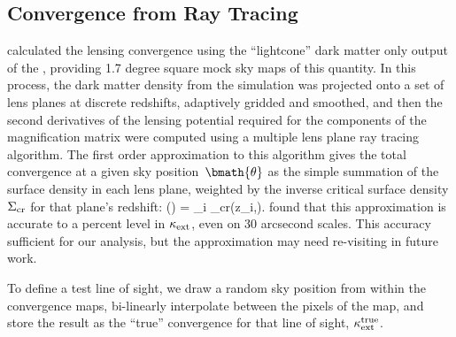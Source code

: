 \documentclass[useAMS,usenatbib,a4paper]{mn2e}
\begin{document}

\subsection{Convergence from Ray Tracing}
\label{sec:MS:raytracing}

\citet{HilbertEtal2009} calculated the lensing convergence using the
``lightcone'' dark matter only  output of the \MS, providing 1.7 degree
square  mock sky maps of this quantity. In this process, the dark matter
density from the simulation was projected onto a set of lens planes at
discrete redshifts, adaptively gridded and smoothed, and then the second
derivatives of the  lensing potential required for the components of the
magnification matrix were computed using a multiple lens plane ray tracing
algorithm. The first order approximation to this algorithm \citep[equation 17
of][]{HilbertEtal2009} gives the total convergence at a given sky
position~$\bmath{\theta}$ as the simple summation of the surface density in
each lens plane, weighted by the inverse critical surface density $\Sigma_{\rm
cr}$ for that plane's redshift:
\be
\kappax(\bmath{\theta}) = \sum_i 
                                     {\Sigma_{\rm cr}(z_i,\zs)}.
\ee
\citet{HilbertEtal2009} found that this approximation is accurate to a percent level
in $\kappa_{\rm ext}$, even on 30 arcsecond scales. This accuracy sufficient for our analysis, but 
the approximation may need re-visiting in future work.

To define a test line of sight, we draw a random sky position from
within the convergence maps, bi-linearly interpolate between the pixels
of the map, and store the result as the ``true'' convergence for that
line of sight, $\kappa_{\rm ext}^{\rm true}$. 




\end{document}
